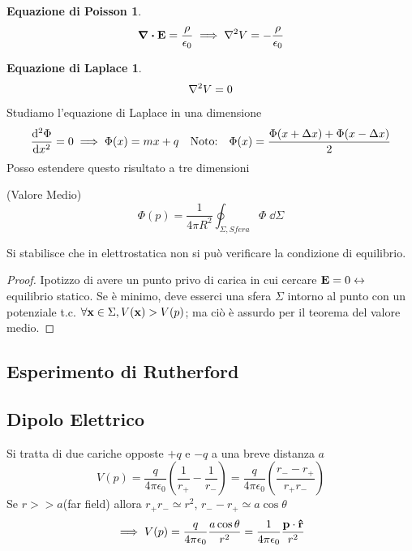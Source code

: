 \documentclass[12pt,a4paper]{article}
\begin{document}
\newtheorem*{EP}{Equazione di Poisson}
\begin{EP}
    \begin{equation*}
        \div \vb{E}= \frac{\rho}{\epsilon_0}\implies \laplacian V = -\frac{\rho}{\epsilon_0}
    \end{equation*}
\end{EP}

\newtheorem*{EL}{Equazione di Laplace}
\begin{EL}
    \begin{equation*}
        \laplacian V = 0
    \end{equation*}
\end{EL}





Studiamo l'equazione di Laplace in una dimensione
\begin{equation*}
    \dv[2]{\Phi}{x}=0 \implies\Phi(x) = mx + q \quad \text{Noto:} \quad\Phi(x) = \frac{\Phi(x+\Delta x)+\Phi(x-\Delta x)}{2}
\end{equation*}
Posso estendere questo risultato a tre dimensioni
\begin{theorem}
    (Valore Medio)
    \begin{equation*}
        \Phi(p)= \frac{1}{4\pi R^2}\oint_{\Sigma, Sfera} \Phi \;\dd{\Sigma}
    \end{equation*}
\end{theorem}

\begin{proposition}
    Si stabilisce che in elettrostatica non si può verificare la condizione di equilibrio.
\end{proposition}
\begin{proof}
    Ipotizzo di avere un punto privo di carica in cui cercare $\vb{E}=0 \leftrightarrow$ equilibrio statico.
    Se è minimo, deve esserci una sfera $\Sigma$ intorno al punto con un potenziale t.c. $\forall\vb{x}\in\Sigma, V(\vb{x})>V(p)$;
    ma ciò è assurdo per il teorema del valore medio.
\end{proof}

\subsection{Esperimento di Rutherford}

\subsection{Dipolo Elettrico}
Si tratta di due cariche opposte $+ q$ e $-q$ a una breve distanza $a$
\begin{equation*}
    V(p)= \frac{q}{4\pi\epsilon_0}\left( \frac{1}{r_+}-\frac{1}{r_-} \right)= \frac{q}{4\pi\epsilon_0}\left( \frac{r_--r_+}{r_+r_-}\right)
\end{equation*}
Se $r>>a$(far field) allora $r_+r_-\simeq r^2$, $r_--r_+\simeq a \cos \theta$
\begin{equation*}
    \implies V(p)=  \frac{q}{4\pi\epsilon_0}\frac{a \cos \theta}{r^2}= \frac{1}{4\pi\epsilon_0}\frac{\vb{p}\cdot\vu{r}}{r^2}
\end{equation*}
\end{document}
